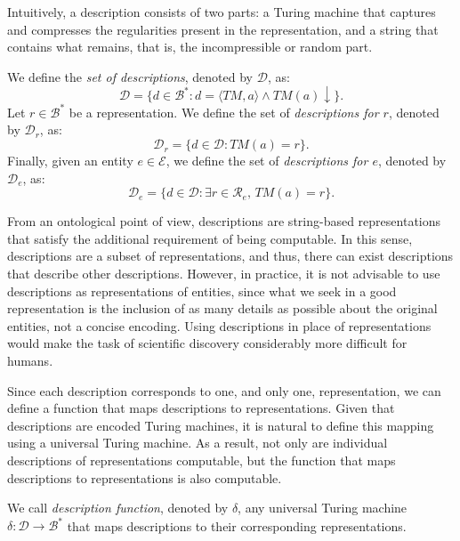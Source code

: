 Intuitively, a description consists of two parts: a Turing machine that captures and compresses the regularities present in the representation, and a string that contains what remains, that is, the incompressible or random part.

\begin{definition}
\label{def:descriptions_model}
We define the \emph{set of descriptions}, denoted by $\mathcal{D}$, as:
\[
\mathcal{D} = \{ d \in \mathcal{B}^\ast : d = \langle TM,a \rangle \wedge TM(a) \downarrow \}.
\]
Let $r \in \mathcal{B}^\ast$ be a representation. We define the set of \emph{descriptions for $r$}, denoted by $\mathcal{D}_r$, as:
\[
\mathcal{D}_r = \{ d \in \mathcal{D} : TM(a) = r \}.
\]
Finally, given an entity $e \in \mathcal{E}$, we define the set of \emph{descriptions for $e$}, denoted by $\mathcal{D}_e$, as:
\[
\mathcal{D}_e = \{ d \in \mathcal{D} : \exists r \in \mathcal{R}_e,\, TM(a) = r \}.
\]
\end{definition}

From an ontological point of view, descriptions are string-based representations that satisfy the additional requirement of being computable. In this sense, descriptions are a subset of representations, and thus, there can exist descriptions that describe other descriptions. However, in practice, it is not advisable to use descriptions as representations of entities, since what we seek in a good representation is the inclusion of as many details as possible about the original entities, not a concise encoding. Using descriptions in place of representations would make the task of scientific discovery considerably more difficult for humans.

Since each description corresponds to one, and only one, representation, we can define a function that maps descriptions to representations. Given that descriptions are encoded Turing machines, it is natural to define this mapping using a universal Turing machine. As a result, not only are individual descriptions of representations computable, but the function that maps descriptions to representations is also computable.

\begin{definition}
We call \emph{description function}, denoted by $\delta$, any universal Turing machine $\delta : \mathcal{D} \rightarrow \mathcal{B}^\ast$ that maps descriptions to their corresponding representations.
\end{definition}

